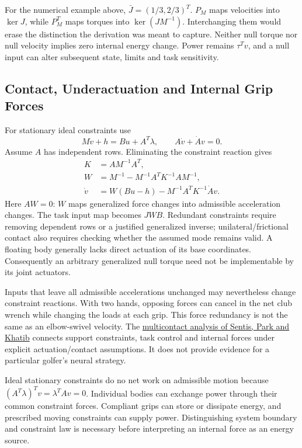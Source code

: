 For the numerical example above, $\bar J=(1/3,2/3)^T$. $P_M$ maps velocities into $\ker J$, while $P_M^T$ maps torques into $\ker(JM^{-1})$. Interchanging them would erase the distinction the derivation was meant to capture. Neither null torque nor null velocity implies zero internal energy change. Power remains $\tau^Tv$, and a null input can alter subsequent state, limits and task sensitivity.

\subsection{Contact, Underactuation and Internal Grip Forces}

For stationary ideal constraints use
\begin{equation}
M\dot v+h=Bu+A^T\lambda,\qquad A\dot v+\dot A v=0.
\end{equation}
Assume $A$ has independent rows. Eliminating the constraint reaction gives
\begin{equation}
\begin{aligned}
K&=AM^{-1}A^T,\\
W&=M^{-1}-M^{-1}A^TK^{-1}AM^{-1},\\
\dot v&=W(Bu-h)-M^{-1}A^TK^{-1}\dot A v.
\end{aligned}
\end{equation}
Here $AW=0$: $W$ maps generalized force changes into admissible acceleration changes. The task input map becomes $JWB$. Redundant constraints require removing dependent rows or a justified generalized inverse; unilateral/frictional contact also requires checking whether the assumed mode remains valid. A floating body generally lacks direct actuation of its base coordinates. Consequently an arbitrary generalized null torque need not be implementable by its joint actuators.

Inputs that leave all admissible accelerations unchanged may nevertheless change constraint reactions. With two hands, opposing forces can cancel in the net club wrench while changing the loads at each grip. This force redundancy is not the same as an elbow-swivel velocity. The \href{https://cs.stanford.edu/groups/manips/publications/pdfs/Sentis_2010_TRO.pdf}{multicontact analysis of Sentis, Park and Khatib} connects support constraints, task control and internal forces under explicit actuation/contact assumptions. It does not provide evidence for a particular golfer's neural strategy.

Ideal stationary constraints do no net work on admissible motion because $(A^T\lambda)^Tv=\lambda^TAv=0$. Individual bodies can exchange power through their common constraint forces. Compliant grips can store or dissipate energy, and prescribed moving constraints can supply power. Distinguishing system boundary and constraint law is necessary before interpreting an internal force as an energy source.

